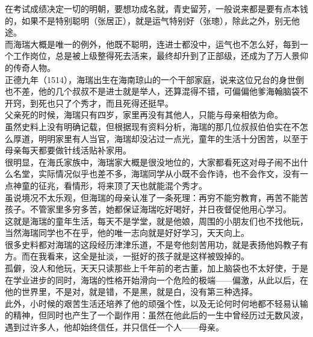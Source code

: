 \begin{multicols}{\theparacolNo}
在考试成绩决定一切的明朝，要想功成名就，青史留芳，一般说来都是要有点本钱的，如果不是特别聪明（张居正），就是运气特别好（张璁），除此之外，别无他途。\\

而海瑞大概是唯一的例外，他既不聪明，连进士都没中，运气也不怎么好，每到一个工作岗位，总是被上级整得死去活来，最终却升到了正部级，还成为了万人景仰的传奇人物。\\

正德九年（1514），海瑞出生在海南琼山的一个干部家庭，说来这位兄台的身世倒也不差，他的几个叔叔不是进士就是举人，还算混得不错，可偏偏他爹海翰脑袋不开窍，到死也只了个秀才，而且死得还挺早。\\

父亲死的时候，海瑞只有四岁，家里再没有其他人，只能与母亲相依为命。\\

虽然史料上没有明确记载，但根据现有资料分析，海瑞的那几位叔叔伯伯实在不怎么厚道，明明家里有人当官，海瑞却没沾过一点光，童年的生活十分困苦，以至于母亲每天都要做针线活贴补家用。\\

很明显，在海氏家族中，海瑞家大概是很没地位的，大家都看死这对母子闹不出什么名堂，实际情况似乎也差不多，海瑞同学从小既不会作诗，也不会作文，没有一点神童的征兆，看情形，将来顶了天也就能混个秀才。\\

虽说境况不太乐观，但海瑞的母亲认准了一条死理：再穷不能穷教育，再苦不能苦孩子。不管家里多穷多苦，她都保证海瑞吃好喝好，并日夜督促他用心学习。\\

这就是海瑞的童年生活，每天不是学堂，就是他娘，周围的小朋友们也不找他玩，当然海瑞同学也不在乎，他的唯一志向就是好好学习，天天向上。\\

很多史料都对海瑞的这段经历津津乐道，不是夸他刻苦用功，就是表扬他妈教子有方。而在我看来，这全是扯淡，一挺好的孩子就是这样被毁掉的。\\

孤僻，没人和他玩，天天只读那些上千年前的老古董，加上脑袋也不太好使，于是在学业进步的同时，海瑞的性格开始滑向一个危险的极端——偏激，从此以后，在他的世界里，不是对，就是错，不是黑，就是白，没有第三种选择。\\

此外，小时候的艰苦生活还培养了他的顽强个性，以及无论何时何地都不轻易认输的精神，但同时也产生了一个副作用：虽然在他此后的一生中曾经历过无数风波，遇到过许多人，他却始终信任，并只信任一个人——母亲。\\


\end{multicols}
